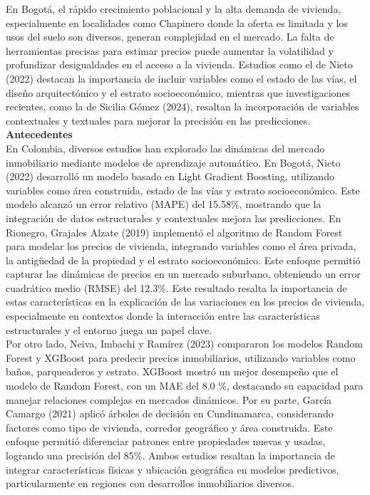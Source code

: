 \documentclass[a4paper]{article}
\theoremstyle{remark}
\theoremstyle{definition}
\begin{document}
En Bogotá, el rápido crecimiento poblacional y la alta demanda de vivienda, especialmente en localidades como Chapinero donde la oferta es limitada y los usos del suelo son diversos, generan complejidad en el mercado. La falta de herramientas precisas para estimar precios puede aumentar la volatilidad y profundizar desigualdades en el acceso a la vivienda. Estudios como el de Nieto (2022) destacan la importancia de incluir variables como el estado de las vías, el diseño arquitectónico y el estrato socioeconómico, mientras que investigaciones recientes, como la de Sicilia Gómez (2024), resaltan la incorporación de variables contextuales y textuales para mejorar la precisión en las predicciones.\\

\textbf{Antecedentes} \\

En Colombia, diversos estudios han explorado las dinámicas del mercado inmobiliario mediante modelos de aprendizaje automático. En Bogotá, Nieto (2022) desarrolló un modelo basado en Light Gradient Boosting, utilizando variables como área construida, estado de las vías y estrato socioeconómico. Este modelo alcanzó un error relativo (MAPE) del 15.58\%, mostrando que la integración de datos estructurales y contextuales mejora las predicciones. En Rionegro, Grajales Alzate (2019) implementó el algoritmo de Random Forest para modelar los precios de vivienda, integrando variables como el área privada, la antigüedad de la propiedad y el estrato socioeconómico. Este enfoque permitió capturar las dinámicas de precios en un mercado suburbano, obteniendo un error cuadrático medio (RMSE) del 12.3\%. Este resultado resalta la importancia de estas características en la explicación de las variaciones en los precios de vivienda, especialmente en contextos donde la interacción entre las características estructurales y el entorno juega un papel clave.\\


Por otro lado, Neiva, Imbachi y Ramírez (2023) compararon los modelos Random Forest y XGBoost para predecir precios inmobiliarios, utilizando variables como baños, parqueaderos y estrato. XGBoost mostró un mejor desempeño que el modelo de Random Forest, con un MAE del 8.0 \%, destacando su capacidad para manejar relaciones complejas en mercados dinámicos. Por su parte, García Camargo (2021) aplicó árboles de decisión en Cundinamarca, considerando factores como tipo de vivienda, corredor geográfico y área construida. Este enfoque permitió diferenciar patrones entre propiedades nuevas y usadas, logrando una precisión del 85\%. Ambos estudios resaltan la importancia de integrar características físicas y ubicación geográfica en modelos predictivos, particularmente en regiones con desarrollos inmobiliarios diversos.\\
\end{document}
